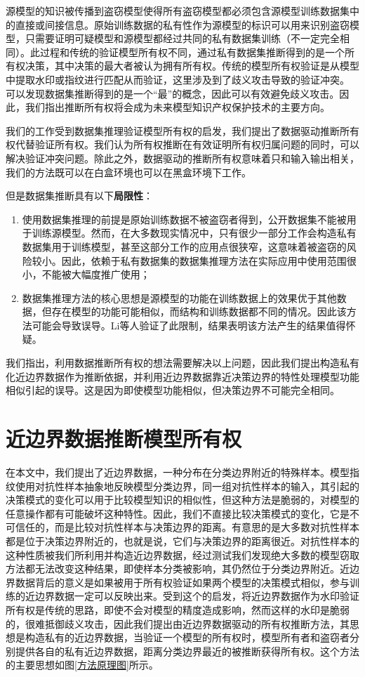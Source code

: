 源模型的知识被传播到盗窃模型使得所有盗窃模型都必须包含源模型训练数据集中的直接或间接信息。原始训练数据的私有性作为源模型的标识可以用来识别盗窃模型，只需要证明可疑模型和源模型都经过共同的私有数据集训练（不一定完全相同）。此过程和传统的验证模型所有权不同，通过私有数据集推断得到的是一个所有权决策，其中决策的最大者被认为拥有所有权。传统的模型所有权验证是从模型中提取水印或指纹进行匹配从而验证，这里涉及到了歧义攻击导致的验证冲突。 可以发现数据集推断得到的是一个“最”的概念，因此可以有效避免歧义攻击。因此，我们指出推断所有权将会成为未来模型知识产权保护技术的主要方向。

我们的工作受到数据集推理验证模型所有权的启发，我们提出了数据驱动推断所有权代替验证所有权。我们认为所有权推断在有效证明所有权归属问题的同时，可以解决验证冲突问题。除此之外，数据驱动的推断所有权意味着只和输入输出相关，我们的方法既可以在白盒环境也可以在黑盒环境下工作。

但是数据集推断具有以下\textbf{局限性}：
\begin{enumerate}
	\renewcommand{\labelenumi}{\theenumi)}
	\item 使用数据集推理的前提是原始训练数据不被盗窃者得到，公开数据集不能被用于训练源模型。然而，在大多数现实情况中，只有很少一部分工作会构造私有数据集用于训练模型，甚至这部分工作的应用点很狭窄，这意味着被盗窃的风险较小。因此，依赖于私有数据集的数据集推理方法在实际应用中使用范围很小，不能被大幅度推广使用；
	\item 数据集推理方法的核心思想是源模型的功能在训练数据上的效果优于其他数据，但存在模型的功能可能相似，而结构和训练数据都不同的情况。因此该方法可能会导致误导。Li等人\cite{lao2022deepauth}验证了此限制，结果表明该方法产生的结果值得怀疑。
\end{enumerate}

我们指出，利用数据推断所有权的想法需要解决以上问题，因此我们提出构造私有化近边界数据作为推断依据，并利用近边界数据靠近决策边界的特性处理模型功能相似引起的误导。这是因为即使模型功能相似，但决策边界不可能完全相同。

\section{近边界数据推断模型所有权}\label{4.2}

在本文中，我们提出了近边界数据，一种分布在分类边界附近的特殊样本。模型指纹\cite{cao2021ipguard}使用对抗性样本抽象地反映模型分类边界，同一组对抗性样本的输入，其引起的决策模式的变化可以用于比较模型知识的相似性，但这种方法是脆弱的，对模型的任意操作都有可能破坏这种特性。因此，我们不直接比较决策模式的变化，它是不可信任的，而是比较对抗性样本与决策边界的距离。有意思的是大多数对抗性样本都是位于决策边界附近的，也就是说，它们与决策边界的距离很近。对抗性样本的这种性质被我们所利用并构造近边界数据，经过测试我们发现绝大多数的模型窃取方法都无法改变这种结果，即使样本分类被影响，其仍然位于分类边界附近。近边界数据背后的意义是如果被用于所有权验证如果两个模型的决策模式相似，参与训练的近边界数据一定可以反映出来。受到这个的启发，将近边界数据作为水印验证所有权是传统的思路，即使不会对模型的精度造成影响，然而这样的水印是脆弱的，很难抵御歧义攻击，因此我们提出由近边界数据驱动的所有权推断方法，其思想是构造私有的近边界数据，当验证一个模型的所有权时，模型所有者和盗窃者分别提供各自的私有近边界数据，距离分类边界最近的被推断获得所有权。这个方法的主要思想如图\ref{方法原理图}所示。


